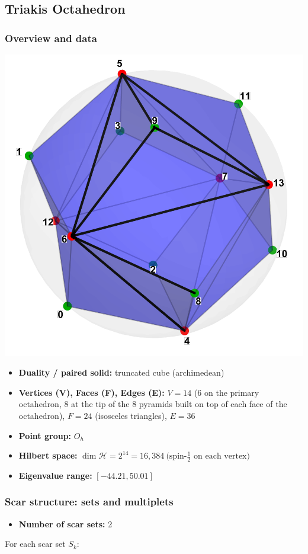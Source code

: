 \documentclass[11pt,a4paper]{article}
\begin{document}
\subsection*{Triakis Octahedron}

\subsubsection*{Overview and data}
\begin{center}
  \includegraphics[width=.6\linewidth]{triakisoctahedron}
\end{center}

\begin{itemize}[leftmargin=1.5em]
  \item \textbf{Duality / paired solid:} truncated cube (archimedean)
  \item \textbf{Vertices (V), Faces (F), Edges (E):} $V = 14$ (6 on the primary octahedron, 8 at the tip of the 8 pyramids built on top of each face of the octahedron),\; $F = 24$ (isosceles triangles),\; $E = 36$
  \item \textbf{Point group:} $O_h$
  \item \textbf{Hilbert space:} \(
        \dim\mathcal{H} = 2^{14} = 16,384\ \text{(spin-$\tfrac12$ on each vertex)}
        \)
  \item \textbf{Eigenvalue range:} $[-44.21, 50.01]$
\end{itemize}

\subsubsection*{Scar structure: sets and multiplets}

\begin{itemize}[leftmargin=1.5em]
  \item \textbf{Number of scar sets:} 2
  \end{itemize}
  \hspace{6mm}For each scar set $S_k$:\\
\end{document}
